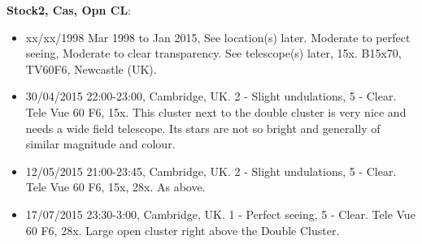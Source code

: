 {\bf Stock2, Cas, Opn CL}:
\begin{itemize}
\item xx/xx/1998 Mar 1998 to Jan 2015, See location(s) later. Moderate to perfect seeing, Moderate to clear transparency. See telescope(s) later, 15x. B15x70, TV60F6, Newcastle (UK).
\item 30/04/2015 22:00-23:00, Cambridge, UK. 2 - Slight undulations, 5 - Clear. Tele Vue 60 F6, 15x. This cluster next to the double cluster is very nice and needs a wide field telescope. Its stars are not so bright and generally of similar magnitude and colour.
\item 12/05/2015 21:00-23:45, Cambridge, UK. 2 - Slight undulations, 5 - Clear. Tele Vue 60 F6, 15x, 28x. As above. 
\item 17/07/2015 23:30-3:00, Cambridge, UK. 1 - Perfect seeing, 5 - Clear. Tele Vue 60 F6, 28x. Large open cluster right above the Double Cluster. 
\end{itemize}
